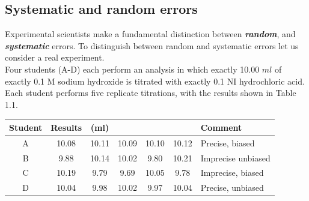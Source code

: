 \documentclass[compress]{beamer}        %
\begin{document}
\subsection*{Systematic and random errors}
\begin{frame}
Experimental scientists make a fundamental distinction between \textbf{\emph{random}}, and
 \textbf{\emph{systematic}} errors. To distinguish between random and systematic errors let
us consider a real experiment.\\

\noindent Four students (A-D) each perform an analysis in which exactly 10.00 $ml$
of exactly 0.1 M sodium hydroxide is titrated with exactly 0.1 NI
hydrochloric acid.
Each student performs five replicate titrations, with the results shown in
Table 1.1.
\end{frame}
\begin{frame}
\begin{tabular}{|c|ccccc|l|}
  \hline
Student & Results  & (ml) &  &  &  &Comment \\ \hline
A & 10.08 & 10.11 &10.09 &10.10&10.12 & Precise, biased\\ \hline
B & 9.88 &10.14& 10.02 &9.80& 10.21& Imprecise unbiased\\ \hline
C & 10.19 &9.79& 9.69 &10.05& 9.78 & Imprecise, biased\\ \hline
D & 10.04 &9.98 &10.02 &9.97 &10.04 & Precise, unbiased \\
  \hline
\end{tabular}
\bigskip
\end{frame}
\end{document}
